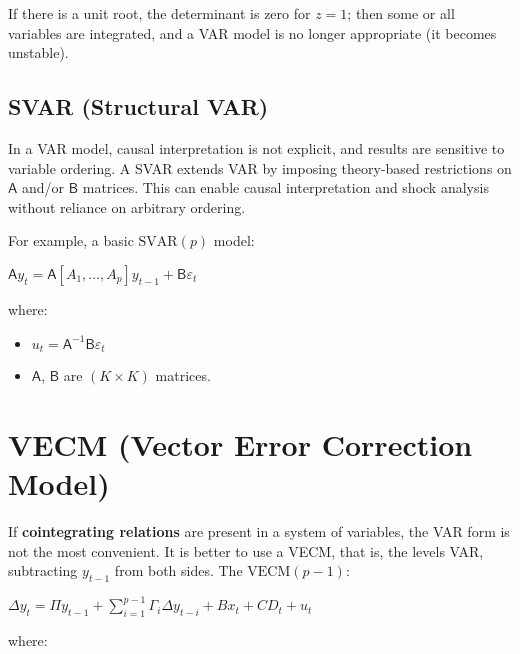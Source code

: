 \documentclass[10pt, a4paper, landscape]{article}
\begin{document}
\begin{multicols}{2}
If there is a unit root, the determinant is zero for \( z = 1 \); then some or all variables are integrated, and a VAR model is no longer appropriate (it becomes unstable).

\subsection*{SVAR (Structural VAR)}

In a VAR model, causal interpretation is not explicit, and results are sensitive to variable ordering. A SVAR extends VAR by imposing theory-based restrictions on \( \mathsf{A} \) and/or \( \mathsf{B} \) matrices. This can enable causal interpretation and shock analysis without reliance on arbitrary ordering.

For example, a basic \( \text{SVAR}(p) \) model:

\begin{center}
	\( \mathsf{A} y_t = \mathsf{A} [A_1, \ldots, A_p] y_{t - 1} + \mathsf{B} \varepsilon_t \)
\end{center}

where:

\begin{itemize}[leftmargin=*]
	\item \( u_t = \mathsf{A}^{-1} \mathsf{B} \varepsilon_t \)
	\item \( \mathsf{A} \), \( \mathsf{B} \) are \( (K \times K) \) matrices.
\end{itemize}

\columnbreak

\section*{VECM (Vector Error Correction Model)}

If \textbf{cointegrating relations} are present in a system of variables, the VAR form is not the most convenient. It is better to use a VECM, that is, the levels VAR, subtracting \( y_{t - 1} \) from both sides. The \( \text{VECM}(p - 1) \):

\begin{center}
	\( \Delta y_{t} = \Pi y_{t - 1} + \sum_{i = 1}^{p - 1} \Gamma_{i} \Delta y_{t - i} + B x_{t} + CD_{t} + u_{t} \)
\end{center}

where:


\end{multicols}
\end{document}
